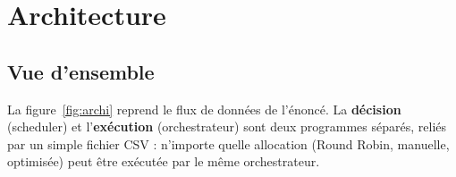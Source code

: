 \section{Architecture}
\label{sec:architecture}

\subsection{Vue d'ensemble}

La figure~\ref{fig:archi} reprend le flux de données de l'énoncé. La
\textbf{décision} (scheduler) et l'\textbf{exécution} (orchestrateur) sont deux
programmes séparés, reliés par un simple fichier CSV : n'importe quelle
allocation (Round Robin, manuelle, optimisée) peut être exécutée par le même
orchestrateur.

